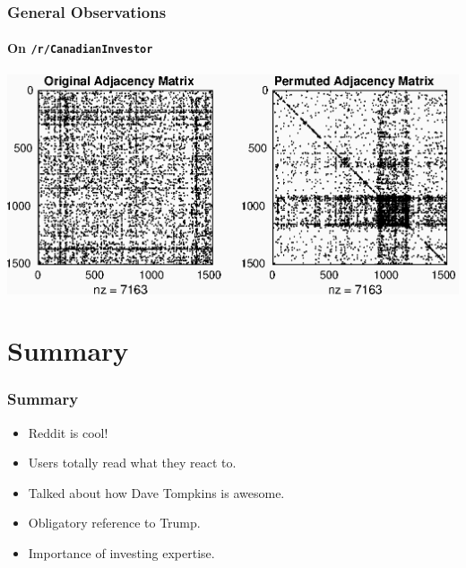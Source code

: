 \documentclass[frame number]{beamer}
\begin{document}
\begin{frame}
  \frametitle{General Observations}
  \framesubtitle{On \texttt{/r/CanadianInvestor}}
  \begin{center}
    \includegraphics[width=\textwidth]{figures/CanadianInvestor.eps}
  \end{center}
\end{frame}

\section{Summary}
\begin{frame}
  \frametitle{Summary}
  \begin{itemize}
    \item<1->{Reddit is cool!}
    \item<2->{Users totally read what they react to.}
    \item<3->{Talked about how Dave Tompkins is awesome.}
    \item<4->{Obligatory reference to Trump.}
    \item<5->{Importance of investing expertise.}
  \end{itemize}
\end{frame}
\end{document}
